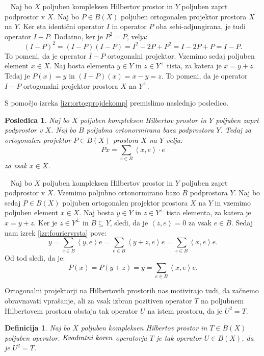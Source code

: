 \documentclass[12pt,a4paper,oneside,fleqn,openany]{book}
\newtheorem{posledica}[izrek]{Posledica}
\newtheorem{definicija}[izrek]{Definicija}
\newcommand{\eopf}{\raisebox{0.8ex}{\framebox{}}} %
\newenvironment{dokaz}%
{\noindent{\bf Dokaz.}\ }%
{\hfill\eopf\par\bigskip}%
\newcommand{\pojem}[1]{\ensuremath{\emph{#1}}}
\newcommand{\Sp}[2]{\ensuremath{\left<#1, #2\right>}}
\begin{document}
\begin{dokaz}
	Naj bo $X$ poljuben kompleksen Hilbertov prostor in $Y$ poljuben zaprt podprostor v $X$. Naj bo $P\in B(X)$ poljuben ortogonalen projektor prostora $X$ na $Y$. Ker sta identični operator $I$ in operator $P$ oba sebi-adjungirana, je tudi operator $I-P$. Dodatno, ker je $P^2 = P$, velja: $$(I-P)^2 = (I-P)(I-P) = I^2 - 2P + P^2 = I - 2P + P = I-P.$$ To pomeni, da je operator $I-P$ ortogonalni projektor.
	Vzemimo sedaj poljuben element $x\in X$. Naj bosta elementa $y\in Y$ in $z\in Y^\bot$ tista, za katera je $x = y + z$. Tedaj je $P(x) = y$ in $(I-P)(x) = x - y = z$. To pomeni, da je operator $I-P$ ortogonalni projektor prostora $X$ na $Y^\bot$.
\end{dokaz}
S pomočjo izreka \ref{izr:ortogprojdekomp} premislimo naslednjo posledico.
\begin{posledica}
	\label{posl:ortprojsum}
	Naj bo $X$ poljuben kompleksen Hilbertov prostor in $Y$ poljuben zaprt podprostor v $X$. Naj bo $B$ poljubna ortonormirana baza podprostora $Y$. Tedaj za ortogonalen projektor $P\in B(X)$ prostora $X$ na $Y$ velja: $$Px = \sum_{e\in B}\Sp{x}{e}\cdot e$$ za vsak $x\in X$.
\end{posledica}

\begin{dokaz}
	Naj bo $X$ poljuben kompleksen Hilbertov prostor in $Y$ poljuben zaprt podprostor v $X$. Vzemimo poljubno ortonormirano bazo $B$ podprostora $Y$. Naj bo sedaj $P\in B(X)$ poljuben ortogonalen projektor prostora $X$ na $Y$ in vzemimo poljuben element $x\in X$. Naj bosta $y\in Y$ in $z\in Y^\bot$ tista elementa, za katera je $x = y + z$. Ker je $z\in Y^{\bot}$ in $B \subseteq Y$, sledi, da je $\Sp{z}{e}=0$ za vsak $e\in B$. Sedaj nam izrek \ref{izr:fouriervrsta} pove: $$y = \sum_{e\in B}\Sp{y}{e}e = \sum_{e\in B}\Sp{y+z}{e}e = \sum_{e\in B}\Sp{x}{e}e.$$	Od tod sledi, da je: $$P(x) = P(y + z) = y = \sum_{e\in B}\Sp{x}{e}e.$$
\end{dokaz}

Ortogonalni projektorji na Hilbertovih prostorih nas motivirajo tudi, da začnemo obravnavati vprašanje, ali za vsak izbran pozitiven operator $T$ na poljubnem Hilbertovem prostoru obstaja tak operator $U$ na istem prostoru, da je $U^2 = T$. 

\begin{definicija}
	\label{def:opkoren}
	Naj bo $X$ poljuben kompleksen Hilbertov prostor in $T\in B(X)$ poljuben operator. \pojem{Kvadratni koren} operatorja $T$ je tak operator $U\in B(X)$, da je $U^2 = T$.
\end{definicija}
\end{document}
